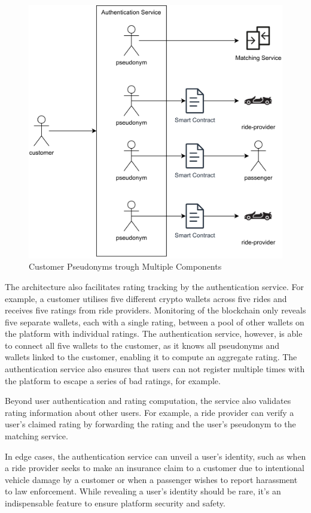 \begin{figure}[h]
    \centering
    \includegraphics[height=0.40\textheight]{data/2.svg}
    \caption{Customer Pseudonyms trough Multiple Components}
    \label{fig:directSVG}
\end{figure}


The architecture also facilitates rating tracking by the authentication service. For example, a customer utilises five different crypto wallets across five rides and receives five ratings from ride providers. Monitoring of the blockchain only reveals five separate wallets, each with a single rating, between a pool of other wallets on the platform with individual ratings. The authentication service, however, is able to connect all five wallets to the customer, as it knows all pseudonyms and wallets linked to the customer, enabling it to compute an aggregate rating. The authentication service also ensures that users can not register multiple times with the platform to escape a series of bad ratings, for example.

Beyond user authentication and rating computation, the service also validates rating information about other users. For example, a ride provider can verify a user's claimed rating by forwarding the rating and the user's pseudonym to the matching service. 

In edge cases, the authentication service can unveil a user's identity, such as when a ride provider seeks to make an insurance claim to a customer due to intentional vehicle damage by a customer or when a passenger wishes to report harassment to law enforcement. While revealing a user's identity should be rare, it's an indispensable feature to ensure platform security and safety.

